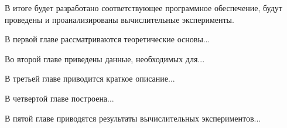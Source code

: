 В итоге будет разработано соответствующее программное обеспечение, будут проведены и проанализированы вычислительные эксперименты.

В первой главе рассматриваются теоретические основы...

Во второй главе приведены данные, необходимых для...

В третьей главе приводится краткое описание...

В четвертой главе построена...

В пятой главе приводятся результаты вычислительных экспериментов...